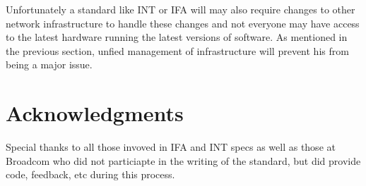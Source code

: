 \documentclass[letterpaper,twocolumn,10pt]{article}
\begin{document}
Unfortunately a standard like INT or IFA will may also require changes
to other network infrastructure to handle these changes and not everyone
may have access to the latest hardware running the latest versions of
software.  As mentioned in the previous section, unfied management of
infrastructure will prevent his from being a major issue.

\section{Acknowledgments}

Special thanks to all those invoved in IFA and INT specs as well as
those at Broadcom who did not particiapte in the writing of the
standard, but did provide code, feedback, etc during this process.

{\normalsize 
}

\theendnotes
\end{document}
